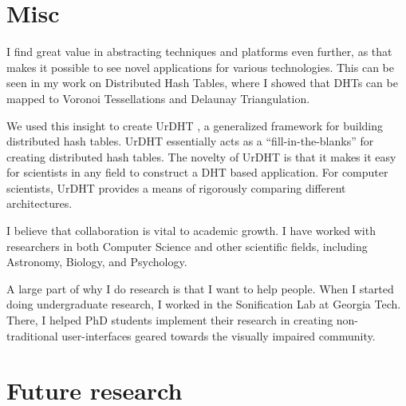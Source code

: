 \documentclass[10pt, a4paper]{article}
\begin{document}
\section{Misc}

I find great value in abstracting techniques and platforms even further, as that makes it possible to see novel applications for various technologies.  
This can be seen in my work on Distributed Hash Tables, where I showed that DHTs can be mapped to Voronoi Tessellations and Delaunay Triangulation.


We used this insight to create UrDHT \cite{urdht}, a generalized framework for building distributed hash tables.
UrDHT essentially acts as a ``fill-in-the-blanks'' for creating  distributed hash tables.
The novelty of UrDHT is that it makes it easy for scientists in any field to construct a DHT based application.
For computer scientists, UrDHT provides a means of rigorously comparing different architectures.




I believe that collaboration is vital to academic growth.
I have worked with researchers in both Computer Science and other scientific fields, including Astronomy, Biology, and Psychology.








A large part of why I do research is that I want to help people.
When I started doing undergraduate research, I worked in the Sonification Lab at Georgia Tech.
There, I helped PhD students implement their research in creating  non-traditional user-interfaces geared towards the visually impaired community.



\section{Future research}





\end{document}
